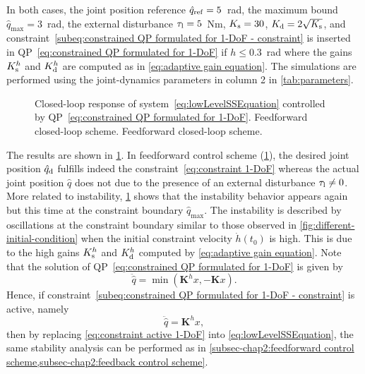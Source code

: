 In both cases, the joint position reference $\hat{q}_{\rm ref} = 5$~rad, the maximum bound $\hat{q}_{\max} = 3$~rad, the external disturbance $\tau_{\rm l}=5$~Nm, $K_{\rm s} = 30$, $K_{\rm d} = 2\sqrt{K_{\rm s}}$, and constraint~\cref{subeq:constrained QP formulated for 1-DoF - constraint} is inserted in QP~\eqref{eq:constrained QP formulated for 1-DoF} if $h\leq 0.3$~rad where the gains $K_{\rm s}^h$ and $K_{\rm d}^h$ are computed as in \cref{eq:adaptive gain equation}.  The simulations are performed using the joint-dynamics parameters in column 2 in \cref{tab:parameters}.
\begin{figure}
	\centering
	\hfil
	\caption{Closed-loop response of system~\eqref{eq:lowLevelSSEquation} controlled by QP~\eqref{eq:constrained QP formulated for 1-DoF}.  Feedforward closed-loop scheme.  Feedforward closed-loop scheme.}
	\label{fig:OL-CL constraint 1-DoF}
\end{figure}

The results are shown in \cref{fig:OL-CL constraint 1-DoF}. In feedforward control scheme (\cref{fig:OL-CL constraint 1-DoF}), the desired joint position $\hat{q}_{\rm d}$ fulfills indeed the constraint~\eqref{eq:constraint 1-DoF} whereas the actual joint position $\hat{q}$ does not due to the presence of an external disturbance $\tau_{\rm l}\neq0$. More related to instability, \cref{fig:OL-CL constraint 1-DoF} shows that the instability behavior appears again but this time at the constraint boundary $\hat{q}_{\max}$.  The instability is described by oscillations at the constraint boundary similar to those observed in \cref{fig:different-initial-condition} when the initial constraint velocity $\dot{h}(t_0)$ is high.  This is due to the high gains $K_{\rm s}^h$ and $K_{\rm d}^h$ computed by \cref{eq:adaptive gain equation}.  
Note that the solution of QP~\eqref{eq:constrained QP formulated for 1-DoF} is given by 
\begin{equation}\label{eq:solution constrained QP 1-DoF}
	\ddot{\hat{q}} = \min(\mathbf{K}^hx,-\mathbf{K}x).
\end{equation} 
Hence, if constraint~\eqref{subeq:constrained QP formulated for 1-DoF - constraint} is active, namely
\begin{equation}\label{eq:constraint active 1-DoF}
	\ddot{\hat{q}} = \mathbf{K}^hx, 
\end{equation} 
then by replacing \cref{eq:constraint active 1-DoF} into \cref{eq:lowLevelSSEquation}, the same stability analysis can be performed as in \cref{subsec-chap2:feedforward control scheme,subsec-chap2:feedback control scheme}. 

